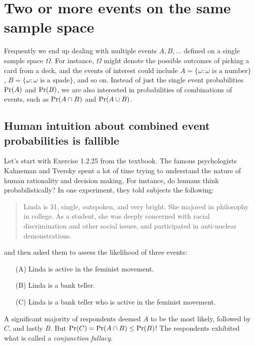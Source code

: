 \documentclass{report}
\theoremstyle{plain}
\theoremstyle{definition}
\newcommand{\pr}{\mbox{\rm Pr}}
\begin{document}
\lecturer{}
\scribe{}

\maketitle

\section{Two or more events on the same sample space}

Frequently we end up dealing with multiple events $A,B,\ldots$ defined on a single sample space $\Omega$. For instance, $\Omega$ might denote the possible outcomes of picking a card from a deck, and the events of interest could include $A = \{\omega: \mbox{$\omega$ is a number}\}$, $B = \{\omega: \mbox{$\omega$ is a spade}\}$, and so on. Instead of just the single event probabilities $\pr(A)$ and $\pr(B)$, we are also interested in probabilities of combinations of events, such as $\pr(A \cap B)$ and $\pr(A \cup B)$.

\subsection{Human intuition about combined event probabilities is fallible}

Let's start with Exercise 1.2.25 from the textbook. The famous psychologists Kahneman and Tversky spent a lot of time trying to understand the nature of human rationality and decision making. For instance, do humans think probabilistically? In one experiment, they told subjects the following:
\begin{quote}
Linda is 31, single, outspoken, and very bright. She majored in philosophy in college. As a student, she was deeply concerned with racial discrimination and other social issues, and participated in anti-nuclear demonstrations.
\end{quote}
and then asked them to assess the likelihood of three events:
\begin{enumerate}
\item[(A)] Linda is active in the feminist movement.
\item[(B)] Linda is a bank teller.
\item[(C)] Linda is a bank teller who is active in the feminist movement.
\end{enumerate}
A significant majority of respondents deemed $A$ to be the most likely, followed by $C$, and lastly $B$. But $\pr(C) = \pr(A \cap B) \leq \pr(B)$! The respondents exhibited what is called a {\it conjunction fallacy}.
\end{document}
